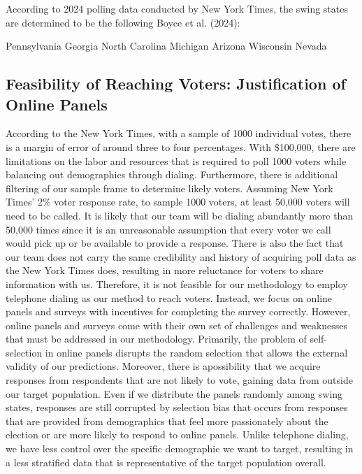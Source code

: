 \documentclass[
  letterpaper,
  DIV=11,
  numbers=noendperiod]{scrartcl}
\begin{document}
According to 2024 polling data conducted by New York Times, the swing
states are determined to be the following Boyce et al. (2024):

Pennsylvania Georgia North Carolina Michigan Arizona Wisconsin Nevada

\hypertarget{feasibility-of-reaching-voters-justification-of-online-panels}{%
\subsection{Feasibility of Reaching Voters: Justification of Online
Panels}\label{feasibility-of-reaching-voters-justification-of-online-panels}}

According to the New York Times, with a sample of 1000 individual votes,
there is a margin of error of around three to four percentages. With
\$100,000, there are limitations on the labor and resources that is
required to poll 1000 voters while balancing out demographics through
dialing. Furthermore, there is additional filtering of our sample frame
to determine likely voters. Assuming New York Times' 2\% voter response
rate, to sample 1000 voters, at least 50,000 voters will need to be
called. It is likely that our team will be dialing abundantly more than
50,000 times since it is an unreasonable assumption that every voter we
call would pick up or be available to provide a response. There is also
the fact that our team does not carry the same credibility and history
of acquiring poll data as the New York Times does, resulting in more
reluctance for voters to share information with us. Therefore, it is not
feasible for our methodology to employ telephone dialing as our method
to reach voters. Instead, we focus on online panels and surveys with
incentives for completing the survey correctly. However, online panels
and surveys come with their own set of challenges and weaknesses that
must be addressed in our methodology. Primarily, the problem of
self-selection in online panels disrupts the random selection that
allows the external validity of our predictions. Moreover, there is
apossibility that we acquire responses from respondents that are not
likely to vote, gaining data from outside our target population. Even if
we distribute the panels randomly among swing states, responses are
still corrupted by selection bias that occurs from responses that are
provided from demographics that feel more passionately about the
election or are more likely to respond to online panels. Unlike
telephone dialing, we have less control over the specific demographic we
want to target, resulting in a less stratified data that is
representative of the target population overall.
\end{document}
